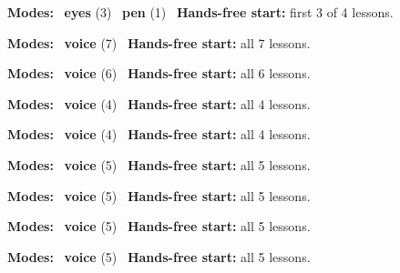\expandafter\def\csname hlchaptermodality39\endcsname{%
  {\small\noindent
    \textbf{Modes:} \hlsightsign{}~\textbf{eyes} (3) \quad \hlpensign{}~\textbf{pen} (1)\quad
    \hlvoicesign{}~\textbf{Hands-free start:} first 3 of 4 lessons.%
    \par}\medskip
}

\expandafter\def\csname hlchaptermodality40\endcsname{%
  {\small\noindent
    \textbf{Modes:} \hlvoicesign{}~\textbf{voice} (7)\quad
    \hlvoicesign{}~\textbf{Hands-free start:} all 7 lessons.%
    \par}\medskip
}

\expandafter\def\csname hlchaptermodality41\endcsname{%
  {\small\noindent
    \textbf{Modes:} \hlvoicesign{}~\textbf{voice} (6)\quad
    \hlvoicesign{}~\textbf{Hands-free start:} all 6 lessons.%
    \par}\medskip
}

\expandafter\def\csname hlchaptermodality42\endcsname{%
  {\small\noindent
    \textbf{Modes:} \hlvoicesign{}~\textbf{voice} (4)\quad
    \hlvoicesign{}~\textbf{Hands-free start:} all 4 lessons.%
    \par}\medskip
}

\expandafter\def\csname hlchaptermodality43\endcsname{%
  {\small\noindent
    \textbf{Modes:} \hlvoicesign{}~\textbf{voice} (4)\quad
    \hlvoicesign{}~\textbf{Hands-free start:} all 4 lessons.%
    \par}\medskip
}

\expandafter\def\csname hlchaptermodality44\endcsname{%
  {\small\noindent
    \textbf{Modes:} \hlvoicesign{}~\textbf{voice} (5)\quad
    \hlvoicesign{}~\textbf{Hands-free start:} all 5 lessons.%
    \par}\medskip
}

\expandafter\def\csname hlchaptermodality45\endcsname{%
  {\small\noindent
    \textbf{Modes:} \hlvoicesign{}~\textbf{voice} (5)\quad
    \hlvoicesign{}~\textbf{Hands-free start:} all 5 lessons.%
    \par}\medskip
}

\expandafter\def\csname hlchaptermodality46\endcsname{%
  {\small\noindent
    \textbf{Modes:} \hlvoicesign{}~\textbf{voice} (5)\quad
    \hlvoicesign{}~\textbf{Hands-free start:} all 5 lessons.%
    \par}\medskip
}

\expandafter\def\csname hlchaptermodality47\endcsname{%
  {\small\noindent
    \textbf{Modes:} \hlvoicesign{}~\textbf{voice} (5)\quad
    \hlvoicesign{}~\textbf{Hands-free start:} all 5 lessons.%
    \par}\medskip
}

